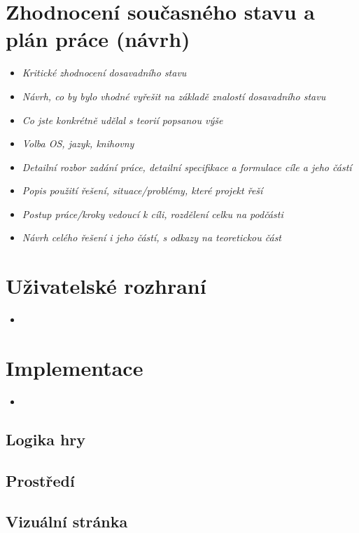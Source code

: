 \chapter{Zhodnocení současného stavu a plán práce (návrh)}
\label{navrh}
\begin{itemize}
  \item \textit {Kritické zhodnocení dosavadního stavu}
  \item \textit {Návrh, co by bylo vhodné vyřešit na základě znalostí dosavadního stavu}
  \item \textit {Co jste konkrétně udělal s teorií popsanou výše}
  \item \textit {Volba OS, jazyk, knihovny}
  \item \textit {Detailní rozbor zadání práce, detailní specifikace a formulace cíle a jeho částí}
  \item \textit {Popis použití řešení, situace/problémy, které projekt řeší}
  \item \textit {Postup práce/kroky vedoucí k cíli, rozdělení celku na podčásti}
  \item \textit {Návrh celého řešení i jeho částí, s odkazy na teoretickou část}
\end{itemize}

\chapter{Uživatelské rozhraní}
\label{rozhrani}

\begin{itemize}
  \item \textit {}
\end{itemize}

\chapter{Implementace}
\label{implementace}

\begin{itemize}
  \item \textit {}
\end{itemize}

\section{Logika hry}
\section{Prostředí}
\section{Vizuální stránka}
